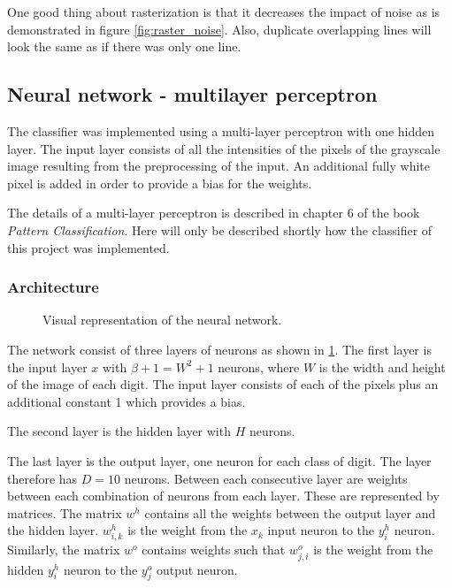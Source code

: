 \documentclass[report.tex]{subfile}
\begin{document}
One good thing about rasterization is that it decreases the impact of noise as
is demonstrated in figure \ref{fig:raster_noise}. Also, duplicate overlapping
lines will look the same as if there was only one line.

\subsection{Neural network - multilayer perceptron}
The classifier was implemented using a multi-layer perceptron with one hidden
layer. The input layer consists of all the intensities of the pixels of the
grayscale image resulting from the preprocessing of the input. An additional
fully white pixel is added in order to provide a bias for the weights.

The details of a multi-layer perceptron is described in chapter 6 of the book
\emph{Pattern Classification}\cite{hart-pattern}. Here will only be described
shortly how the classifier of this project was implemented.

\subsubsection{Architecture}
\begin{figure}[h]
    \centering
    
    \caption{Visual representation of the neural network.}
    \label{fig:mlp}
\end{figure}
The network consist of three layers of neurons as shown in \ref{fig:mlp}.  The
first layer is the input layer $x$ with $\beta+1=W^2+1$ neurons, where $W$ is
the width and height of the image of each digit. The input layer consists of
each of the pixels plus an additional constant 1 which provides a bias.

The second layer is the hidden layer with $H$ neurons.

The last layer is the output layer, one neuron for each class of digit. The
layer therefore has $D=10$ neurons. Between each consecutive layer are weights
between each combination of neurons from each layer. These are represented by
matrices. The matrix $w^h$ contains all the weights between the output layer
and the hidden layer. $w^h_{i,k}$ is the weight from the $x_k$ input neuron to
the $y^h_i$ neuron. Similarly, the matrix $w^o$ contains weights such that
$w^o_{j,i}$ is the weight from the hidden $y^h_i$ neuron to the $y^o_j$ output
neuron.

\end{document}
